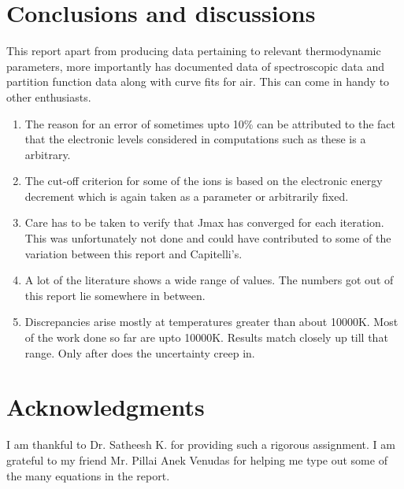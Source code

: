 \documentclass[]{aelab_aiaa-tc}%
\begin{document}
\section{Conclusions and discussions}

This report apart from producing data pertaining to relevant thermodynamic parameters, more importantly has documented data of spectroscopic data and partition function data along with curve fits for air. This can come in handy to other enthusiasts. 

\begin{enumerate}
	\item The reason for an error of sometimes upto 10\% can be attributed to the fact that the electronic levels considered in computations such as these is a arbitrary.
	\item The cut-off criterion for some of the ions is based on the electronic energy decrement which is again taken as a parameter or arbitrarily fixed.
	\item Care has to be taken to verify that Jmax has converged for each iteration. This was unfortunately not done and could have contributed to some of the variation between this report and Capitelli's.
	\item A lot of the literature shows a wide range of values. The numbers got out of this report lie somewhere in between.
	\item Discrepancies arise mostly at temperatures greater than about 10000K. Most of the work done so far are upto 10000K. Results match closely up till that range. Only after does the uncertainty creep in.
\end{enumerate}

	


\section*{Acknowledgments}

I am thankful to Dr. Satheesh K. for providing such a rigorous assignment. I am grateful to my friend Mr. Pillai Anek Venudas for helping me type out some of the many equations in the report.
\end{document}
